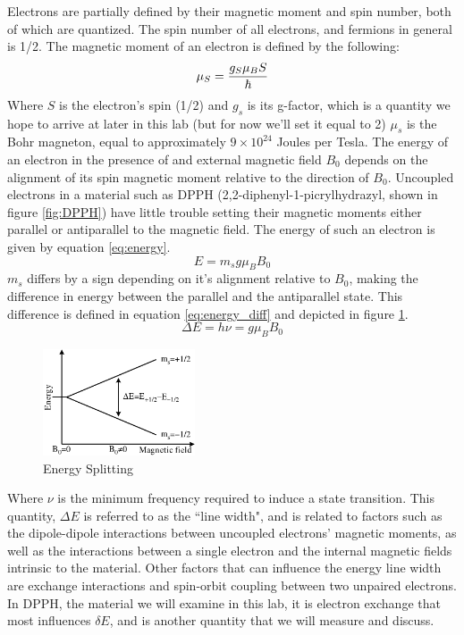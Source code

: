 \documentclass{amsart}
\begin{document}
Electrons are partially defined by their magnetic moment and spin number, both of which are quantized. The spin number of all electrons, and fermions in general is 1/2. The magnetic moment of an electron is defined by the following:
\begin{equation}
    {\bf \mu}_S = \dfrac{g_S \mu_B S}{\hbar}
\end{equation}
Where $S$ is the electron's spin (1/2) and $g_s$ is its g-factor, which is a quantity we hope to arrive at later in this lab (but for now we'll set it equal to 2) $\mu_s$ is the Bohr magneton, equal to approximately $9 \times 10^{24}$ Joules per Tesla.
The energy of an electron in the presence of and external magnetic field $B_0$ depends on the alignment of its spin magnetic moment relative to the direction of $B_0$. Uncoupled electrons in a material such as DPPH (2,2-diphenyl-1-picrylhydrazyl, shown in figure \ref{fig:DPPH}) have little trouble setting their magnetic moments either parallel or antiparallel to the magnetic field. The energy of such an electron is given by equation \ref{eq:energy}.
\begin{equation}
    E = m_sg\mu_BB_0
    \label{eq:energy}
\end{equation}
$m_s$ differs by a sign depending on it's alignment relative to $B_0$, making the difference in energy between the parallel and the antiparallel state. This difference is defined in equation \ref{eq:energy_diff} and depicted in figure \ref{fig:energy_diff}.
\begin{equation}
    \Delta E = h\nu = g\mu_B B_0
    \label{eq:energy_diff}
\end{equation}
\begin{figure}
    \centering
    \includegraphics[width=0.4\textwidth]{splitting.png}
    \caption{Energy Splitting}
    \label{fig:energy_diff}
\end{figure}
Where $\nu$ is the minimum frequency required to induce a state transition. This quantity, $\Delta E$ is referred to as the ``line width", and is related to factors such as the dipole-dipole interactions between uncoupled electrons' magnetic moments, as well as the interactions between a single electron and the internal magnetic fields intrinsic to the material. Other factors that can influence the energy line width are exchange interactions and spin-orbit coupling between two unpaired electrons. In DPPH, the material we will examine in this lab, it is electron exchange that most influences $\delta E$, and is another quantity that we will measure and discuss.
\end{document}
